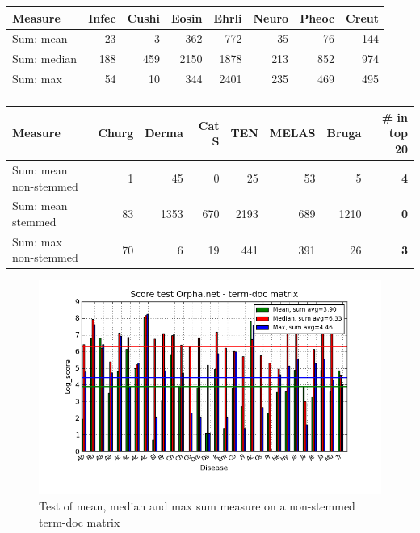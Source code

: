 \begin{table}[H]
  \begin{tiny}
    \label{testResult_termDoc_bmj_hist_3000_sum_mea_med_max}
    \begin{tabular}{|l|r|r|r|r|r|r|r|}
      \hline
      Measure &Infec&Cushi&Eosin&Ehrli&Neuro&Pheoc&Creut \\
      \hline
      Sum: mean &23&3&362&772&35&76&144 \\
      \hline
      Sum: median &188&459&2150&1878&213&852&974 \\
      \hline
      Sum: max &54&10&344&2401&235&469&495  \\
      \hline
      \multicolumn{8}{c}{} \\
    \end{tabular}
    \begin{tabular}{|l|r|r|r|r|r|r|r|}
      \hline
      Measure &Churg&Derma&Cat S&TEN&MELAS&Bruga& \scriptsize{\textbf{\# in top 20}} \\
      \hline
      Sum: mean non-stemmed &1&45&0&25&53&5& \scriptsize{\textbf{4}} \\
      \hline
      Sum: mean stemmed &83&1353&670&2193&689&1210 &  \scriptsize{\textbf{0}}\\
      \hline
      Sum: max non-stemmed &70&6&19&441&391&26 & \scriptsize{\textbf{3}} \\
      \hline
    \end{tabular}
  \end{tiny}
\end{table}

\begin{figure}[H]
  \caption{Test of mean, median and max sum measure on a non-stemmed term-doc matrix}
  \begin{center}
    \includegraphics[width=1.2\textwidth]{barcharts/termDoc_orphan_hist_3000_ns_mea_med_max_sum.png}
  \end{center}
  \label{termDoc_orphan_hist_3000_ns_mea_med_max_sum}
\end{figure}


